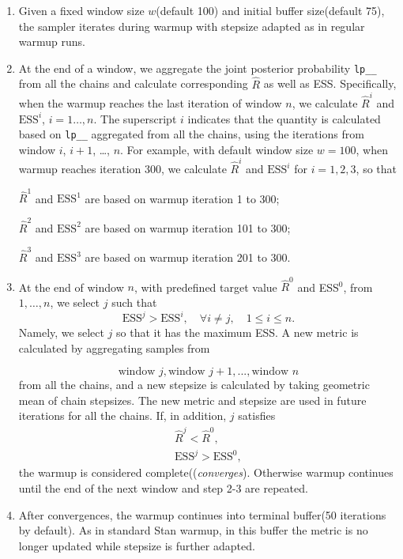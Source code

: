 \documentclass[11pt, reqno, oneside]{amsart}
\begin{document}
\begin{enumerate}
\item Given a fixed window size \(w\)(default 100) and initial buffer size(default 75), the sampler iterates during warmup with stepsize adapted as in regular warmup runs.
\item At the end of a window, we aggregate the joint posterior probability \texttt{lp\_\_} from all the chains and calculate corresponding \(\hat{R}\) as well as ESS. 
Specifically, when the warmup reaches the last iteration of window
\(n\), we calculate \(\hat{R}^i\) and \(\text{ESS}^i\), \(i=1\dots,n\). The
superscript \(i\) indicates that the quantity is calculated based on
\texttt{lp\_\_} aggregated from all the chains, using the iterations from
window \(i\), \(i+1\), \dots{}, \(n\). For example, with default window
size \(w=100\), when warmup reaches iteration 300, we calculate
\(\hat{R}^i\) and \(\text{ESS}^i\) for \(i=1, 2, 3\), so that

\(\hat{R}^1\) and \(\text{ESS}^1\) are based on warmup iteration 1 to 300;

\(\hat{R}^2\) and \(\text{ESS}^2\) are based on warmup iteration 101 to 300;

\(\hat{R}^3\) and \(\text{ESS}^3\) are based on warmup iteration 201 to 300.

\item At the end of window \(n\), with predefined target value \(\hat{R}^{0}\) and ESS\(^{0}\), from \({1, \dots, n}\),  we select \(j\) such that
\begin{equation}
\text{ESS}^j > \text{ESS}^i,\quad \forall i\neq j, \quad 1\le i\le n.
\end{equation}
Namely, we select \(j\) so that it has the maximum ESS. A new metric
is calculated by aggregating samples from

\begin{equation*}   
   \text{window } j, \text{window } j+1, ..., \text{window } n
\end{equation*}
from all the chains, and a new stepsize is calculated by taking geometric mean
of chain stepsizes. The new metric and stepsize are used in future iterations for all the chains.
If, in addition, \(j\) satisfies
\begin{equation}
\begin{aligned}
\hat{R}^j < \hat{R}^0,\\
\text{ESS}^j > \text{ESS}^0,
\end{aligned}
\end{equation}
the warmup is considered complete((\emph{converges}). Otherwise warmup continues until
the end of the next window and step 2-3 are repeated.
\item After convergences, the warmup
continues into terminal buffer(50 iterations by default). As in
standard Stan warmup, in this buffer the metric is no longer
updated while stepsize is further adapted.
\end{enumerate}
\end{document}
